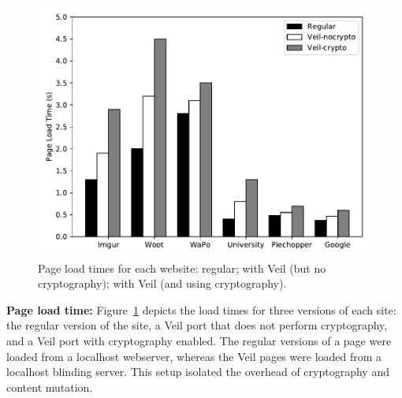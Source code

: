 \begin{figure}
	\centering
	\includegraphics[width=\textwidth]{veil-figs/perf_graph.pdf}
	\caption{Page load times for each website: regular; with Veil (but no cryptography); with Veil (and using cryptography).}
	\label{fig:loadTime}
\end{figure}

\noindent
\textbf{Page load time:}
Figure~\ref{fig:loadTime} depicts the load times
for three versions of each site: the regular version
of the site, a Veil port that does not perform
cryptography, and a Veil port with cryptography
enabled. The regular versions of a page were loaded
from a localhost webserver, whereas the Veil pages
were loaded from a localhost blinding server. This setup
isolated the overhead of cryptography and content
mutation.

